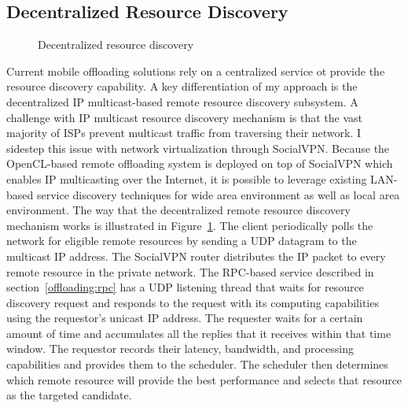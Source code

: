 \subsection{Decentralized Resource Discovery}
\label{offloading:discovery}
%
\begin{figure}
\centering
{}
\caption{Decentralized resource discovery}
\label{fig:discovery}
\end{figure}
%
Current mobile offloading solutions rely on a centralized service ot
provide the resource discovery capability.
%
A key differentiation of my approach is the decentralized IP
multicast-based remote resource discovery subsystem.
%
A challenge with IP multicast resource discovery mechanism is that the
vast majority of ISPs prevent multicast traffic from traversing their
network.
%
I sidestep this issue with network virtualization through SocialVPN.
%
Because the OpenCL-based remote offloading system is deployed on top of
SocialVPN which enables IP multicasting over the Internet, it is
possible to leverage existing LAN-based service discovery techniques for
wide area environment as well as local area environment.
%
The way that the decentralized remote resource discovery mechanism works
is illustrated in Figure~\ref{fig:discovery}.
%
The client periodically polls the network for eligible remote resources
by sending a UDP datagram to the multicast IP address.
%
The SocialVPN router distributes the IP packet to every remote resource
in the private network.
%
The RPC-based service described in section~\ref{offloading:rpc} has a
UDP listening thread that waits for resource discovery request and
responds to the request with its computing capabilities using the
requestor's unicast IP address.
%
The requester waits for a certain amount of time and accumulates all the
replies that it receives within that time window.
%
The requestor records their latency, bandwidth, and processing
capabilities and provides them to the scheduler.
%
The scheduler then determines which remote resource will provide the
best performance and selects that resource as the targeted candidate.
%
